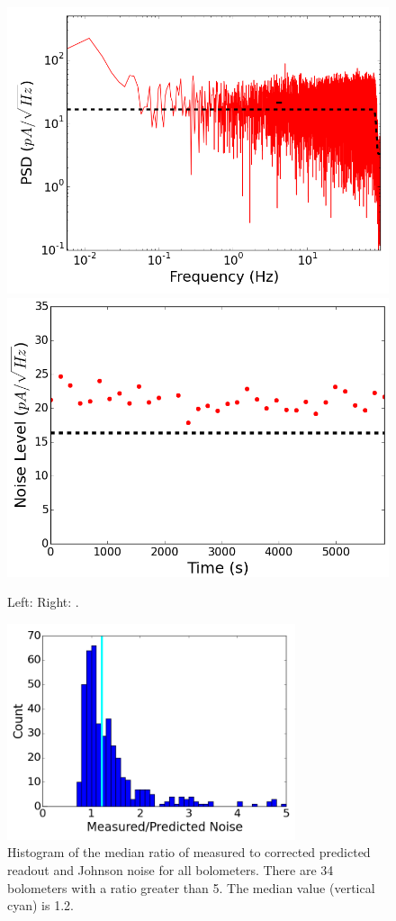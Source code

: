 \begin{figure}[ht!]
\begin{center}
\includegraphics[width=0.48\columnwidth]{figures/board66_wire1_ch03_1356968507s_overbias}
\includegraphics[width=0.48\columnwidth]{figures/board66_wire1_ch03_overbias}
\caption{Left: 
Right: . 
\label{fig:one_bolo_overbias_noise} }
\end{center}
\end{figure}

\begin{figure}[ht!]
\begin{center}
\includegraphics[height=2.5in]{figures/overbias_noise_ratios_histogram}
\caption{Histogram of the median ratio of measured to corrected predicted readout and Johnson noise for all bolometers. 
There are 34 bolometers with a ratio greater than 5.
The median value (vertical cyan) is 1.2. 
\label{fig:overbias_noise_hist} }
\end{center}
\end{figure}

